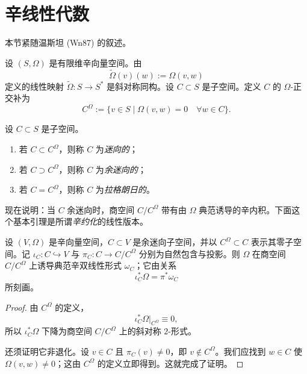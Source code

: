 \section{辛线性代数}
\label{sec:symplectic-linear-algebra}

本节紧随温斯坦 (Wn87) 的叙述。

设 $(S,\Omega)$ 是有限维辛向量空间。由
\[
 \widetilde\Omega(v)(w):=\Omega(v,w)
\]
定义的线性映射 $\widetilde\Omega:S\to S^*$ 是斜对称同构。设 $C\subset S$ 是子空间。定义 $C$ 的 $\Omega$-正交补为
\[
 C^\Omega:=\{v\in S\mid \Omega(v,w)=0\quad\forall w\in C\}.
\]

\begin{definition}\label{def:isotropic-coisotropic-lagrangian}
设 $C\subset S$ 是子空间。
\begin{enumerate}[label=(\arabic*)]
\item 若 $C\subset C^\Omega$，则称 $C$ 为\emph{迷向的}；
\item 若 $C\supset C^\Omega$，则称 $C$ 为\emph{余迷向的}；
\item 若 $C=C^\Omega$，则称 $C$ 为\emph{拉格朗日的}。
\end{enumerate}
\end{definition}

现在说明：当 $C$ 余迷向时，商空间 $C/C^\Omega$ 带有由 $\Omega$ 典范诱导的辛内积。下面这个基本引理是所谓\emph{辛约化}的线性版本。

\begin{lemma}\label{lem:linear-symplectic-reduction}
设 $(V,\Omega)$ 是辛向量空间，$C\subset V$ 是余迷向子空间，并以 $C^\Omega\subset C$ 表示其零子空间。记 $\iota_C:C\hookrightarrow V$ 与
$\pi_C:C\to C/C^\Omega$ 分别为自然包含与投影。则 $\Omega$ 在商空间 $C/C^\Omega$ 上诱导典范辛双线性形式 $\omega_C$；它由关系
\begin{equation}
 \iota_C^*\Omega=\pi^*\omega_C
 \label{eq:linear-reduction-form}
\end{equation}
所刻画。
\end{lemma}

\begin{proof}
由 $C^\Omega$ 的定义，
\[
 \iota_C^*\Omega|_{C^\Omega}\equiv0,
\]
所以 $\iota_C^*\Omega$ 下降为商空间 $C/C^\Omega$ 上的斜对称 $2$-形式。

还须证明它非退化。设 $v\in C$ 且 $\pi_C(v)\ne0$，即 $v\notin C^\Omega$。我们应找到 $w\in C$ 使 $\Omega(v,w)\ne0$；这由 $C^\Omega$ 的定义立即得到。这就完成了证明。
\end{proof}

